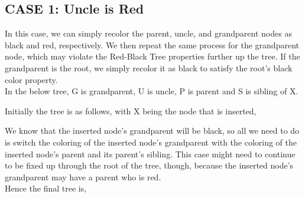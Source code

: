 \documentclass{article}
\begin{document}
\subsection{CASE 1: Uncle is Red}
In this case, we can simply recolor the parent, uncle, and grandparent nodes as black and red, respectively. We then repeat the same process for the grandparent node, which may violate the Red-Black Tree properties further up the tree. If the grandparent is the root, we simply recolor it as black to satisfy the root's black color property.\\
In the below tree, G is grandparent, U is uncle, P is parent and S is sibling of X.\\
\begin{center}
\end{center}
\pagebreak
Initially the tree is as follows, with X being the node that is inserted,
\begin{center}
\end{center}
We know that the inserted node's grandparent will be black, so all we need to do is switch the coloring of the inserted node's grandparent with the coloring of the inserted node's parent and its parent's sibling. This case might need to continue to be fixed up through the root of the tree, though, because the inserted node's grandparent may have a parent who is red.
\\Hence the final tree is,
\begin{center}
\end{center}
\end{document}
